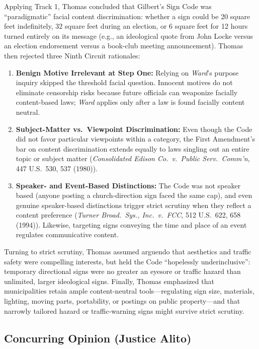 \documentclass[12pt]{article}
\begin{document}
Applying Track 1, Thomas concluded that Gilbert's Sign Code was ``paradigmatic'' facial content discrimination: whether a sign could be 20 square feet indefinitely, 32 square feet during an election, or 6 square feet for 12 hours turned entirely on its message (e.g., an ideological quote from John Locke versus an election endorsement versus a book-club meeting announcement). Thomas then rejected three Ninth Circuit rationales:
\begin{enumerate}
  \item \textbf{Benign Motive Irrelevant at Step One:} Relying on \textit{Ward}'s purpose inquiry skipped the threshold facial question. Innocent motives do not eliminate censorship risks because future officials can weaponize facially content-based laws; \textit{Ward} applies only after a law is found facially content neutral.
  \item \textbf{Subject-Matter vs.\ Viewpoint Discrimination:} Even though the Code did not favor particular viewpoints within a category, the First Amendment's bar on content discrimination extends equally to laws singling out an entire topic or subject matter (\textit{Consolidated Edison Co.\ v.\ Public Serv.\ Comm'n}, 447 U.S.\ 530, 537 (1980)).
  \item \textbf{Speaker- and Event-Based Distinctions:} The Code was not speaker based (anyone posting a church-direction sign faced the same cap), and even genuine speaker-based distinctions trigger strict scrutiny when they reflect a content preference (\textit{Turner Broad.\ Sys., Inc.\ v.\ FCC}, 512 U.S.\ 622, 658 (1994)). Likewise, targeting signs conveying the time and place of an event regulates communicative content.
\end{enumerate}

Turning to strict scrutiny, Thomas assumed arguendo that aesthetics and traffic safety were compelling interests, but held the Code ``hopelessly underinclusive'': temporary directional signs were no greater an eyesore or traffic hazard than unlimited, larger ideological signs. Finally, Thomas emphasized that municipalities retain ample content-neutral tools---regulating sign size, materials, lighting, moving parts, portability, or postings on public property---and that narrowly tailored hazard or traffic-warning signs might survive strict scrutiny.

\subsection{Concurring Opinion (Justice Alito)}
\end{document}
